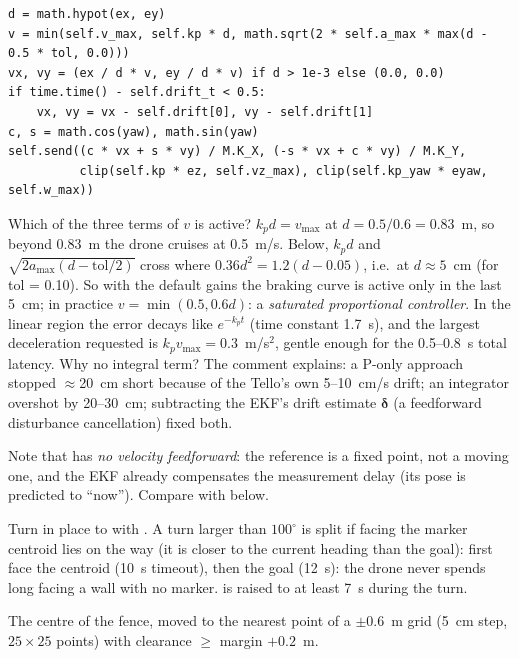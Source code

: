 \begin{lstlisting}
d = math.hypot(ex, ey)
v = min(self.v_max, self.kp * d, math.sqrt(2 * self.a_max * max(d - 0.5 * tol, 0.0)))
vx, vy = (ex / d * v, ey / d * v) if d > 1e-3 else (0.0, 0.0)
if time.time() - self.drift_t < 0.5:
    vx, vy = vx - self.drift[0], vy - self.drift[1]
c, s = math.cos(yaw), math.sin(yaw)
self.send((c * vx + s * vy) / M.K_X, (-s * vx + c * vy) / M.K_Y,
          clip(self.kp * ez, self.vz_max), clip(self.kp_yaw * eyaw, self.w_max))
\end{lstlisting}

\begin{intuition}
Which of the three terms of $v$ is active? $k_p d = v_{\max}$ at $d = 0.5/0.6 = 0.83$~m, so beyond 0.83~m the
drone cruises at 0.5~m/s. Below, $k_p d$ and $\sqrt{2a_{\max}(d-\text{tol}/2)}$ cross where
$0.36 d^2 = 1.2(d - 0.05)$, i.e.\ at $d \approx 5$~cm (for tol = 0.10). So with the default gains the
braking curve is active only in the last 5~cm; in practice $v = \min(0.5, 0.6d)$: a \emph{saturated
proportional controller}. In the linear region the error decays like $e^{-k_p t}$ (time constant 1.7~s), and the
largest deceleration requested is $k_p v_{\max} = 0.3$~m/s$^2$, gentle enough for the 0.5--0.8~s total latency.
Why no integral term? The comment explains: a P-only approach stopped $\approx$20~cm short because of the
Tello's own 5--10~cm/s drift; an integrator overshot by 20--30~cm; subtracting the EKF's drift estimate
$\boldsymbol\delta$ (a feedforward disturbance cancellation) fixed both.
\end{intuition}

Note that  has \emph{no velocity feedforward}: the reference is a fixed point, not a moving one, and
the EKF already compensates the measurement delay (its pose is predicted to ``now''). Compare with
 below.

Turn in place to  with . A turn larger than $100^\circ$ is split if
facing the marker centroid lies on the way (it is closer to the current heading than the goal): first face the
centroid (10~s timeout), then the goal (12~s): the drone never spends long facing a wall with no marker.
 is raised to at least 7~s during the turn.

The centre of the fence, moved to the nearest point of a $\pm 0.6$~m grid (5~cm step, $25 \times 25$ points)
with clearance $\ge$ margin $+0.2$~m.

